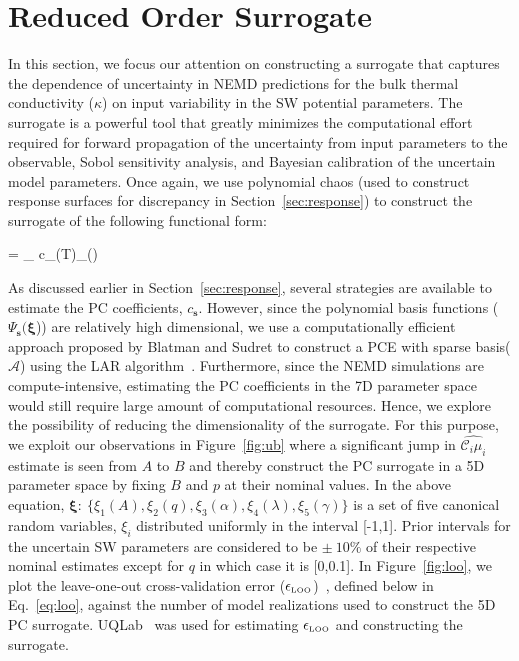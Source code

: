 \section{Reduced Order Surrogate}
\label{sec:ros}

In this section, we focus our attention on constructing a surrogate that captures the dependence of
uncertainty in NEMD predictions for the bulk thermal conductivity ($\kappa$) on input variability
in the SW potential parameters. The surrogate is a powerful tool that greatly minimizes
the computational
effort required for forward propagation of the uncertainty from input parameters to the observable,
Sobol sensitivity analysis, and Bayesian calibration of the uncertain model parameters. Once again,
we use polynomial chaos (used to construct response surfaces for discrepancy in
Section~\ref{sec:response}) to construct the surrogate of the following functional form:

\be
\kappa  = \sum\limits_{\in{}} c_{}(T)\Psi_{}(\bm{\xi})
\ee

As discussed earlier in Section~\ref{sec:response}, several strategies are available to
estimate the PC coefficients, $c_{\bm{s}}$. However, since the polynomial basis functions
($\Psi_{\bm{s}}(\bm{\xi}$)) are
relatively high dimensional, we use a computationally efficient approach proposed by
Blatman and Sudret to construct a PCE with sparse basis($\mathcal{A}$) using the LAR
algorithm~\cite{Blatman:2011}. Furthermore, since the NEMD simulations are compute-intensive,
estimating the PC coefficients in the 7D parameter space would still require large amount of
computational resources. Hence, we explore the possibility of reducing the dimensionality of
the surrogate. For this purpose, we 
exploit our observations in Figure~\ref{fig:ub} where a significant
jump in $\hat{\mathcal{C}_i\mu_i}$ estimate is seen from $A$ to $B$ and thereby construct the 
PC surrogate in a 5D parameter space by fixing $B$ and $p$ at their nominal values. In the above
equation, $\bm{\xi}:~\{\xi_1(A),\xi_2(q),\xi_3(\alpha),\xi_4(\lambda),\xi_5(\gamma)\}$ is a set
of five canonical random variables, $\xi_i$ distributed uniformly in the interval [-1,1].
Prior intervals for the uncertain SW parameters are considered to be
$\pm~10\%$ of their respective nominal estimates except for $q$ in which case it is [0,0.1]. In
Figure~\ref{fig:loo}, we plot the leave-one-out cross-validation error 
($\epsilon_{\tiny{\mbox{LOO}}}$)~\cite{Blatman:2010}, defined
below in Eq.~\ref{eq:loo}, against the number of model realizations used to construct the 5D
PC surrogate. UQLab~\cite{Marelli:2014} was used for estimating $\epsilon_{\tiny{\mbox{LOO}}}$ and constructing
the surrogate. 

